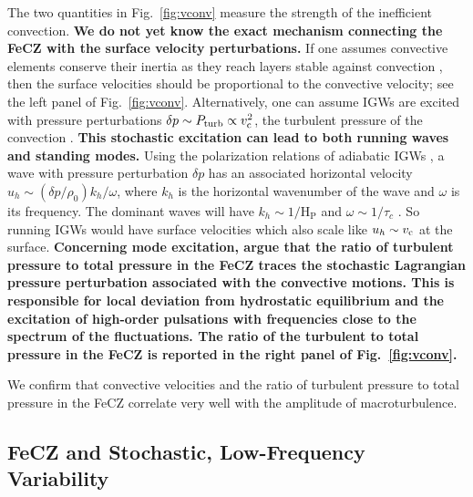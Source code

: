\documentclass[twocolumn]{aastex63}
\begin{document}
The two quantities in Fig.~\ref{fig:vconv} measure the strength of the inefficient convection. %
{\bf We do not yet know the exact mechanism connecting the FeCZ with the surface velocity perturbations.}
If one assumes convective elements conserve their inertia as they reach layers stable against convection \citep[e.g., because they are thermally diffusive, see][]{2015ApJ...813...74J}, then the surface velocities should be proportional to the convective velocity; see the left panel of Fig.~\ref{fig:vconv}.
Alternatively, one can assume IGWs are excited with pressure perturbations $\delta p \sim P_{\rm turb}\propto v_{\rm c}^2$, the turbulent pressure of the convection \citep{Press:1981}.
{\bf This stochastic excitation can lead to both running waves and standing modes.} Using the polarization relations of adiabatic IGWs \citep[e.g.,][]{sutherland_2010}, a wave with pressure perturbation $\delta p$ has an associated horizontal velocity $u_h \sim (\delta p/\rho_0) k_h/\omega$, where $k_h$ is the horizontal wavenumber of the wave and $\omega$ is its frequency.
The dominant waves will have $k_h\sim1/{\mathrm{H}}_{\mathrm P}$ and $\omega\sim1/\tau_c$ \citep{Cantiello:2009}.
So running IGWs would have surface velocities which also scale like $u_h \sim v_{\rm c}$ at the surface.
{\bf Concerning mode excitation, \citet{Grassitelli:2015} argue that the ratio of turbulent pressure to total pressure in the FeCZ traces the stochastic Lagrangian pressure perturbation associated with the convective motions.  This is responsible for local deviation from hydrostatic equilibrium and the excitation of high-order pulsations with frequencies close to the spectrum of the fluctuations. The ratio of the turbulent to total pressure in the FeCZ is reported in the right panel of Fig.~\ref{fig:vconv}. } 

We confirm that convective velocities and the ratio of turbulent pressure to total pressure in the FeCZ correlate very well with the amplitude of macroturbulence. 



\subsection{FeCZ and Stochastic, Low-Frequency Variability}
 
\end{document}
